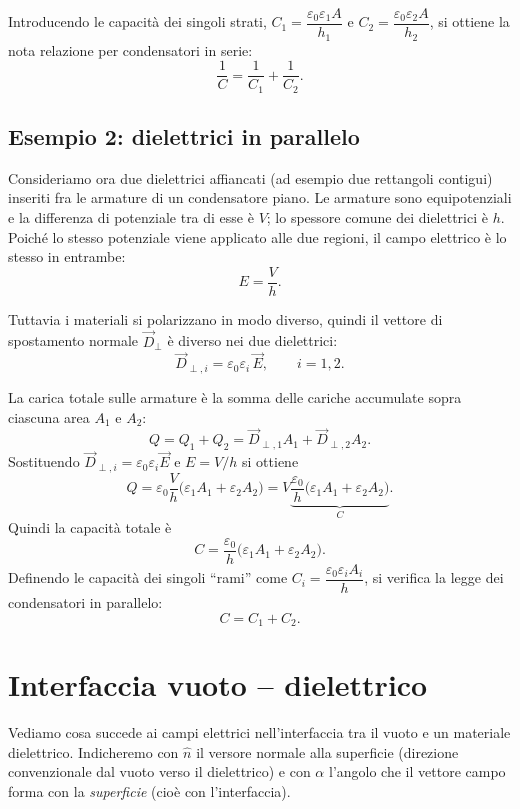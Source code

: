 \documentclass{book}
\begin{document}
Introducendo le capacità dei singoli strati, \(C_1=\dfrac{\varepsilon_0\varepsilon_1 A}{h_1}\) e \(C_2=\dfrac{\varepsilon_0\varepsilon_2 A}{h_2}\), si ottiene la nota relazione per condensatori in serie:
\[
\frac{1}{C}=\frac{1}{C_1}+\frac{1}{C_2}.
\]

\subsection*{Esempio 2: dielettrici in parallelo}

Consideriamo ora due dielettrici affiancati (ad esempio due rettangoli contigui) inseriti fra le armature di un condensatore piano. Le armature sono equipotenziali e la differenza di potenziale tra di esse è \(V\); lo spessore comune dei dielettrici è \(h\). Poiché lo stesso potenziale viene applicato alle due regioni, il campo elettrico è lo stesso in entrambe:
\[
E=\frac{V}{h}.
\]

Tuttavia i materiali si polarizzano in modo diverso, quindi il vettore di spostamento normale \(\vec{D}_{\perp}\) è diverso nei due dielettrici:
\[
\vec{D}_{\perp,i}=\varepsilon_0\varepsilon_i\,\vec{E},\qquad i=1,2.
\]

La carica totale sulle armature è la somma delle cariche accumulate sopra ciascuna area \(A_1\) e \(A_2\):
\[
Q=Q_1+Q_2 = \vec{D}_{\perp,1}A_1 + \vec{D}_{\perp,2}A_2.
\]
Sostituendo \(\vec{D}_{\perp,i}=\varepsilon_0\varepsilon_i \vec{E}\) e \(E=V/h\) si ottiene
\[
Q = \varepsilon_0\frac{V}{h}\bigl(\varepsilon_1 A_1 + \varepsilon_2 A_2\bigr)
= V\underbrace{\frac{\varepsilon_0}{h}\bigl(\varepsilon_1 A_1 + \varepsilon_2 A_2\bigr)}_{C}.
\]
Quindi la capacità totale è
\[
C=\frac{\varepsilon_0}{h}\bigl(\varepsilon_1 A_1 + \varepsilon_2 A_2\bigr).
\]
Definendo le capacità dei singoli “rami” come \(C_i=\dfrac{\varepsilon_0\varepsilon_i A_i}{h}\), si verifica la legge dei condensatori in parallelo:
\[
C = C_1 + C_2.
\]

 
\section{Interfaccia vuoto -- dielettrico}

Vediamo cosa succede ai campi elettrici nell'interfaccia tra il vuoto e un materiale dielettrico.  
Indicheremo con \(\hat{n}\) il versore normale alla superficie (direzione convenzionale dal vuoto verso il dielettrico) e con \(\alpha\) l'angolo che il vettore campo forma con la \emph{superficie} (cioè con l'interfaccia).
\end{document}
